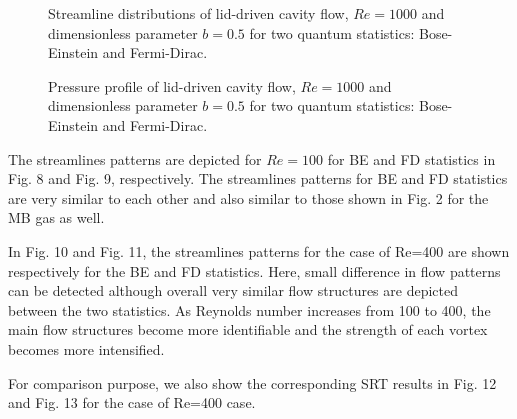 \documentclass[doublecol]{epl2}
\begin{document}
\begin{figure}[ht]
	\centering
	\vfill
	\caption[A set of four subfigures.]{Streamline distributions of lid-driven cavity flow, $Re=1000$ and dimensionless parameter $b=0.5$ for two  quantum statistics:
	 Bose-Einstein and
	 Fermi-Dirac.}
	\label{fig:Streamlines_bp05}
\end{figure}


\begin{figure}[ht]
	\centering
	\vfill
	\caption[A set of four subfigures.]{Pressure profile of lid-driven cavity flow, $Re=1000$ and dimensionless parameter $b=0.5$ for two quantum statistics:
	 Bose-Einstein and
	 Fermi-Dirac.}
	\label{fig:pressure_profile_bp05}
\end{figure}


The streamlines patterns are depicted for $Re=100$ for BE and FD  statistics in Fig. 8 and Fig. 9, respectively. The streamlines patterns for BE and FD statistics are very similar to each other and also similar to those shown in Fig. 2 for the MB gas as well.

In Fig. 10 and Fig. 11, the streamlines patterns for the case of Re=400 are shown respectively for the BE and FD statistics. Here, small difference in flow patterns can be detected although overall very similar flow structures are depicted between the two statistics. As Reynolds number increases from 100 to 400, the main flow structures become more identifiable and the strength of each vortex becomes more intensified.

For comparison purpose, we also show the corresponding SRT results in Fig. 12 and Fig. 13 for the case of Re=400 case.

\end{document}
